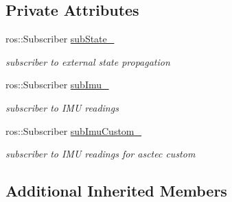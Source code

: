 \subsection*{Private Attributes}
\begin{DoxyCompactItemize}
\item 
ros\-::\-Subscriber \hyperlink{classmsf__core_1_1IMUHandler__ROS_adf8d6fabf4ae2fffd11e82c6c8762f10}{sub\-State\-\_\-}
\begin{DoxyCompactList}\small\item\em subscriber to external state propagation \end{DoxyCompactList}\item 
ros\-::\-Subscriber \hyperlink{classmsf__core_1_1IMUHandler__ROS_a32b7e18f5fc3bf0a7de15ab8ca0bc9f9}{sub\-Imu\-\_\-}
\begin{DoxyCompactList}\small\item\em subscriber to I\-M\-U readings \end{DoxyCompactList}\item 
ros\-::\-Subscriber \hyperlink{classmsf__core_1_1IMUHandler__ROS_ac633011a1f63fc81b16972b3210bd4ec}{sub\-Imu\-Custom\-\_\-}
\begin{DoxyCompactList}\small\item\em subscriber to I\-M\-U readings for asctec custom \end{DoxyCompactList}\end{DoxyCompactItemize}
\subsection*{Additional Inherited Members}


